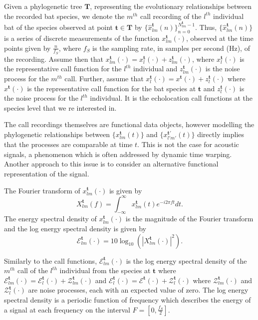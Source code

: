 \documentclass{ws-rv9x6}
\begin{document}
Given a phylogenetic tree \(\mathbf{T}\), representing the evolutionary relationships between the recorded bat species, we denote the \(m^{th}\) call recording of the \(l^{th}\) individual bat of the species observed at point \(\mathbf{t} \in \mathbf{T}\) by \(\{\hat{x}_{lm}^{\mathbf{t}}(n)\}_{n=0}^{N_{lm}^{\mathbf{t}} - 1}\). 
Thus, \(\{\hat{x}_{lm}^{\mathbf{t}}(n)\}\) is a series of discrete measurements of the function \(x_{lm}^{\mathbf{t}}(\cdot)\), observed at the time points given by \(\frac{n}{f_S}\), where \(f_S\) is the sampling rate, in samples per second (Hz), of the recording. Assume then that \(x_{lm}^{\mathbf{t}}(\cdot) = x_{l}^{\mathbf{t}}(\cdot) + z_{lm}^{\mathbf{t}}(\cdot)\), where \(x_{l}^{\mathbf{t}}(\cdot)\) is the representative call function for the \(l^{th}\) individual and \(z_{lm}^{\mathbf{t}}(\cdot)\) is the noise process for the \(m^{th}\) call. Further, assume that \(x_{l}^{\mathbf{t}}(\cdot) = x^{\mathbf{t}}(\cdot) + z_{l}^{\mathbf{t}}(\cdot)\) where \(x^{\mathbf{t}}(\cdot)\) is the representative call function for the bat species at \({\mathbf{t}}\) and \(z_{l}^{\mathbf{t}}(\cdot)\) is the noise process for the \(l^{th}\) individual. It is the echolocation call functions at the species level that we re interested in.

The call recordings themselves are functional data objects, however modelling the phylogenetic relationships between \(\{x_{lm}^{\mathbf{t}}(t)\}\) and \(\{x_{l'm'}^{{\mathbf{t}}'}(t)\}\) directly implies that the processes are comparable at time \(t\). 
This is not the case for acoustic signals, a phenomenon which is often addressed by dynamic time warping.\cite{berndt1994using} Another approach to this issue is to consider an alternative functional representation of the signal. 

The Fourier transform of \(x_{lm}^{\mathbf{t}}(\cdot)\) is given by
\[
X_{lm}^{\mathbf{t}}(f) = \int_{-\infty}^{\infty} x_{lm}^{\mathbf{t}}(t) e^{-i 2\pi f t} dt.
\label{eqn:dft}
\]
The energy spectral density of \(x_{lm}^{\mathbf{t}}(\cdot)\) is the magnitude of the Fourier transform and the log energy spectral density is given by
\[
\mathcal{E}_{lm}^{\mathbf{t}}(\cdot) = 10 \log_{10} \left( |X_{lm}^{\mathbf{t}}(\cdot)|^2 \right).
\]

Similarly to the call functions, \(\mathcal{E}_{lm}^{\mathbf{t}}(\cdot)\) is the log energy spectral density of the \(m^{th}\) call of the \(l^{th}\) individual from the species at \({\mathbf{t}}\) where \(\mathcal{E}_{lm}^{\mathbf{t}}(\cdot) = \mathcal{E}_{l}^{\mathbf{t}}(\cdot) + \mathcal{Z}_{lm}^{\mathbf{t}}(\cdot)\) and \(\mathcal{E}_{l}^{\mathbf{t}}(\cdot) = \mathcal{E}^{\mathbf{t}}(\cdot) + \mathcal{Z}_{l}^{\mathbf{t}}(\cdot)\) where \(\mathcal{Z}_{lm}^{\mathbf{t}}(\cdot)\) and \(\mathcal{Z}_{l}^{\mathbf{t}}(\cdot)\) are noise processes, each with an expected value of zero.  The log energy spectral density is a periodic function of frequency which describes the energy of a signal at each frequency on the interval \(F = [0, \frac{f_S}{2}]\).\cite{antoniou2006digital}
\end{document}
